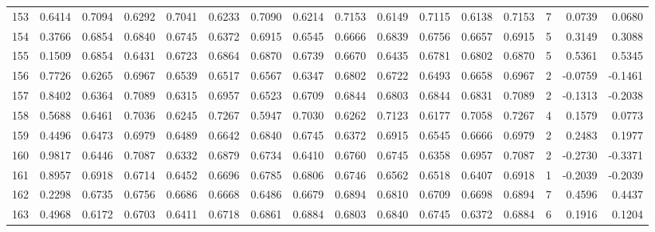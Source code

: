 \begin{tabular}{lrrrrrrrrrrrrrrr}
153 &      0.6414 &  0.7094 &  0.6292 &  0.7041 &  0.6233 &  0.7090 &  0.6214 &  0.7153 &  0.6149 &  0.7115 &   0.6138 &     0.7153 &      7 &                    0.0739 &                     0.0680 \\
154 &      0.3766 &  0.6854 &  0.6840 &  0.6745 &  0.6372 &  0.6915 &  0.6545 &  0.6666 &  0.6839 &  0.6756 &   0.6657 &     0.6915 &      5 &                    0.3149 &                     0.3088 \\
155 &      0.1509 &  0.6854 &  0.6431 &  0.6723 &  0.6864 &  0.6870 &  0.6739 &  0.6670 &  0.6435 &  0.6781 &   0.6802 &     0.6870 &      5 &                    0.5361 &                     0.5345 \\
156 &      0.7726 &  0.6265 &  0.6967 &  0.6539 &  0.6517 &  0.6567 &  0.6347 &  0.6802 &  0.6722 &  0.6493 &   0.6658 &     0.6967 &      2 &                   -0.0759 &                    -0.1461 \\
157 &      0.8402 &  0.6364 &  0.7089 &  0.6315 &  0.6957 &  0.6523 &  0.6709 &  0.6844 &  0.6803 &  0.6844 &   0.6831 &     0.7089 &      2 &                   -0.1313 &                    -0.2038 \\
158 &      0.5688 &  0.6461 &  0.7036 &  0.6245 &  0.7267 &  0.5947 &  0.7030 &  0.6262 &  0.7123 &  0.6177 &   0.7058 &     0.7267 &      4 &                    0.1579 &                     0.0773 \\
159 &      0.4496 &  0.6473 &  0.6979 &  0.6489 &  0.6642 &  0.6840 &  0.6745 &  0.6372 &  0.6915 &  0.6545 &   0.6666 &     0.6979 &      2 &                    0.2483 &                     0.1977 \\
160 &      0.9817 &  0.6446 &  0.7087 &  0.6332 &  0.6879 &  0.6734 &  0.6410 &  0.6760 &  0.6745 &  0.6358 &   0.6957 &     0.7087 &      2 &                   -0.2730 &                    -0.3371 \\
161 &      0.8957 &  0.6918 &  0.6714 &  0.6452 &  0.6696 &  0.6785 &  0.6806 &  0.6746 &  0.6562 &  0.6518 &   0.6407 &     0.6918 &      1 &                   -0.2039 &                    -0.2039 \\
162 &      0.2298 &  0.6735 &  0.6756 &  0.6686 &  0.6668 &  0.6486 &  0.6679 &  0.6894 &  0.6810 &  0.6709 &   0.6698 &     0.6894 &      7 &                    0.4596 &                     0.4437 \\
163 &      0.4968 &  0.6172 &  0.6703 &  0.6411 &  0.6718 &  0.6861 &  0.6884 &  0.6803 &  0.6840 &  0.6745 &   0.6372 &     0.6884 &      6 &                    0.1916 &                     0.1204 \\

\end{tabular}
